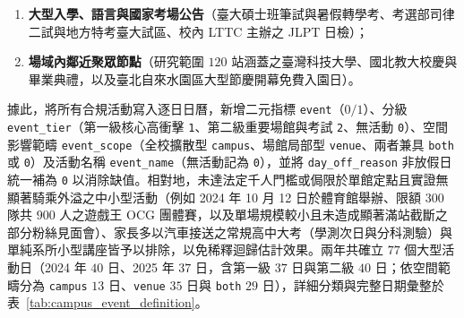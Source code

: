 \begin{enumerate}
\begin{enumerate}[label = \textbullet]
\begin{enumerate}
          \item \textbf{大型入學、語言與國家考場公告}（臺大碩士班筆試與暑假轉學考、考選部司律二試與地方特考臺大試區、校內 LTTC 主辦之 JLPT 日檢）；
          \item \textbf{場域內鄰近聚眾節點}（研究範圍 $120$ 站涵蓋之臺灣科技大學、國北教大校慶與畢業典禮，以及臺北自來水園區大型節慶開幕免費入園日）。
        \end{enumerate}
        據此，將所有合規活動寫入逐日日曆，新增二元指標 \texttt{event}（$0/1$）、分級 \texttt{event\_tier}（第一級核心高衝擊 \texttt{1}、第二級重要場館與考試 \texttt{2}、無活動 \texttt{0}）、空間影響範疇 \texttt{event\_scope}（全校擴散型 \texttt{campus}、場館局部型 \texttt{venue}、兩者兼具 \texttt{both} 或 \texttt{0}）及活動名稱 \texttt{event\_name}（無活動記為 \texttt{0}），並將 \texttt{day\_off\_reason} 非放假日統一補為 \texttt{0} 以消除缺值。相對地，未達法定千人門檻或侷限於單館定點且實證無顯著騎乘外溢之中小型活動（例如 2024 年 10 月 12 日於體育館舉辦、限額 $300$ 隊共 $900$ 人之遊戲王 OCG 團體賽，以及單場規模較小且未造成顯著滿站截斷之部分粉絲見面會）、家長多以汽車接送之常規高中大考（學測次日與分科測驗）與單純系所小型講座皆予以排除，以免稀釋迴歸估計效果。兩年共確立 $77$ 個大型活動日（2024 年 $40$ 日、2025 年 $37$ 日，含第一級 $37$ 日與第二級 $40$ 日；依空間範疇分為 \texttt{campus} $13$ 日、\texttt{venue} $35$ 日與 \texttt{both} $29$ 日），詳細分類與完整日期彙整於表~\ref{tab:campus_event_definition}。
    \end{enumerate}


\end{enumerate}
